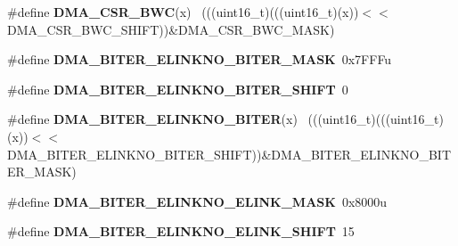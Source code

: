 \begin{DoxyCompactItemize}
\item 
\hypertarget{group___d_m_a___register___masks_gab6be46113dee61b101768aca83099cec}{}\#define {\bfseries D\+M\+A\+\_\+\+C\+S\+R\+\_\+\+B\+W\+C}(x)                                                  ~(((uint16\+\_\+t)(((uint16\+\_\+t)(x))$<$$<$D\+M\+A\+\_\+\+C\+S\+R\+\_\+\+B\+W\+C\+\_\+\+S\+H\+I\+F\+T))\&D\+M\+A\+\_\+\+C\+S\+R\+\_\+\+B\+W\+C\+\_\+\+M\+A\+S\+K)\label{group___d_m_a___register___masks_gab6be46113dee61b101768aca83099cec}

\item 
\hypertarget{group___d_m_a___register___masks_gae018437bb5b22efe7ef42c909c0ddc3e}{}\#define {\bfseries D\+M\+A\+\_\+\+B\+I\+T\+E\+R\+\_\+\+E\+L\+I\+N\+K\+N\+O\+\_\+\+B\+I\+T\+E\+R\+\_\+\+M\+A\+S\+K}~0x7\+F\+F\+Fu\label{group___d_m_a___register___masks_gae018437bb5b22efe7ef42c909c0ddc3e}

\item 
\hypertarget{group___d_m_a___register___masks_gac759c623fdfd96b0bb47471802d9dba8}{}\#define {\bfseries D\+M\+A\+\_\+\+B\+I\+T\+E\+R\+\_\+\+E\+L\+I\+N\+K\+N\+O\+\_\+\+B\+I\+T\+E\+R\+\_\+\+S\+H\+I\+F\+T}~0\label{group___d_m_a___register___masks_gac759c623fdfd96b0bb47471802d9dba8}

\item 
\hypertarget{group___d_m_a___register___masks_ga8b352d3adbc43b600c510e9e05623c2d}{}\#define {\bfseries D\+M\+A\+\_\+\+B\+I\+T\+E\+R\+\_\+\+E\+L\+I\+N\+K\+N\+O\+\_\+\+B\+I\+T\+E\+R}(x)                          ~(((uint16\+\_\+t)(((uint16\+\_\+t)(x))$<$$<$D\+M\+A\+\_\+\+B\+I\+T\+E\+R\+\_\+\+E\+L\+I\+N\+K\+N\+O\+\_\+\+B\+I\+T\+E\+R\+\_\+\+S\+H\+I\+F\+T))\&D\+M\+A\+\_\+\+B\+I\+T\+E\+R\+\_\+\+E\+L\+I\+N\+K\+N\+O\+\_\+\+B\+I\+T\+E\+R\+\_\+\+M\+A\+S\+K)\label{group___d_m_a___register___masks_ga8b352d3adbc43b600c510e9e05623c2d}

\item 
\hypertarget{group___d_m_a___register___masks_ga3ae8b9da1a0c899d39608bc0b92ddd43}{}\#define {\bfseries D\+M\+A\+\_\+\+B\+I\+T\+E\+R\+\_\+\+E\+L\+I\+N\+K\+N\+O\+\_\+\+E\+L\+I\+N\+K\+\_\+\+M\+A\+S\+K}~0x8000u\label{group___d_m_a___register___masks_ga3ae8b9da1a0c899d39608bc0b92ddd43}

\item 
\hypertarget{group___d_m_a___register___masks_gabd481ef160447f9125c779d6483649f0}{}\#define {\bfseries D\+M\+A\+\_\+\+B\+I\+T\+E\+R\+\_\+\+E\+L\+I\+N\+K\+N\+O\+\_\+\+E\+L\+I\+N\+K\+\_\+\+S\+H\+I\+F\+T}~15\label{group___d_m_a___register___masks_gabd481ef160447f9125c779d6483649f0}


\end{DoxyCompactItemize}
